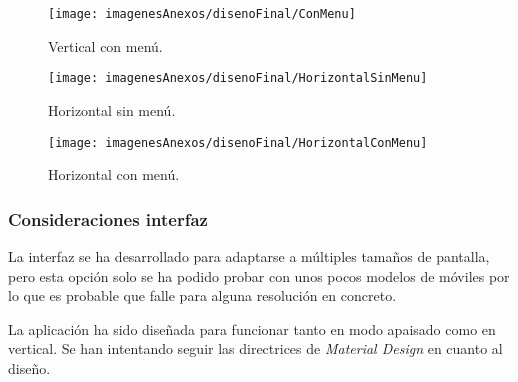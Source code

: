 	\begin{figure}[h]
    	\begin{center}%
        	\begin{center}%
          	\texttt{[image: imagenesAnexos/disenoFinal/ConMenu]}%
          	\caption{Vertical con menú.}%
          	\label{figConMenu}%
        	\end{center}%
  		\end{center}%
	\end{figure}%
	
	\begin{figure}[h]
    	\begin{center}%
        	\begin{center}%
          	\texttt{[image: imagenesAnexos/disenoFinal/HorizontalSinMenu]}%
          	\caption{Horizontal sin menú.}%
          	\label{figHorizontalSinMenu}%
        	\end{center}%
  		\end{center}%
	\end{figure}%
	
	\begin{figure}[h]
    	\begin{center}%
        	\begin{center}%
          	\texttt{[image: imagenesAnexos/disenoFinal/HorizontalConMenu]}%
          	\caption{Horizontal con menú.}%
          	\label{figHorizontalConMenu}%
        	\end{center}%
  		\end{center}%
	\end{figure}%
\clearpage

\subsubsection{Consideraciones interfaz}

La interfaz se ha desarrollado para adaptarse a múltiples tamaños de pantalla, pero esta opción solo se ha podido probar con unos pocos modelos de móviles por lo que es probable que falle para alguna resolución en concreto.

La aplicación ha sido diseñada para funcionar tanto en modo apaisado como en vertical. Se han intentando seguir las directrices de \textit{Material Design} en cuanto al diseño.